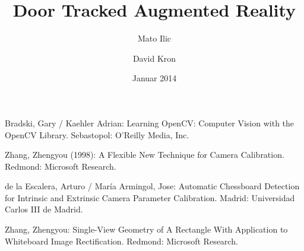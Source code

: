 \documentclass[listof=totocnumbered,bibliography=totocnumbered,12pt]{scrreprt}
\numberwithin{equation}{subsection}
\begin{document}
\subject{Bachelor-Thesis}
\title{Door Tracked Augmented Reality}
\author{Mato Ilic \and David Kron}
\date{Januar 2014}
\publishers{Betreuer: Marcus Hudritsch\\Experte: Andreas Dürsteler}

\maketitle

\tableofcontents
\newpage


\newpage


\newpage


\newpage


\newpage


\newpage


\newpage


\newpage


\newpage


\newpage
\begin{thebibliography}{5}

Bradski, Gary / Kaehler Adrian:
Learning OpenCV: Computer Vision with the OpenCV Library.
Sebastopol: O'Reilly Media, Inc.

Zhang, Zhengyou (1998): A Flexible New Technique for Camera Calibration. 
Redmond: Microsoft Research.

de la Escalera, Arturo / María Armingol, Jose: Automatic Chessboard Detection for Intrinsic and Extrinsic Camera Parameter Calibration. 
Madrid: Universidad Carlos III de Madrid.

Zhang, Zhengyou: Single-View Geometry of A Rectangle With Application to Whiteboard Image Rectification.
Redmond: Microsoft Research.


\end{thebibliography}
\end{document}

